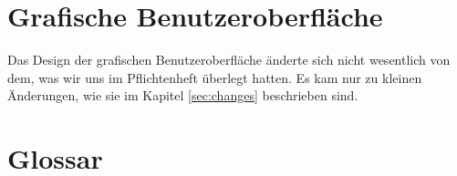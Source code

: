 \documentclass{implementierungsheft}
\begin{document}
\section{Grafische Benutzeroberfläche}
Das Design der grafischen Benutzeroberfläche änderte sich nicht wesentlich von dem, was wir uns im Pflichtenheft überlegt hatten.
Es kam nur zu kleinen Änderungen, wie sie im Kapitel \ref{sec:changes} beschrieben sind.
\newpage
\section{Glossar}
\printglossary[style=altlist]
\end{document}
